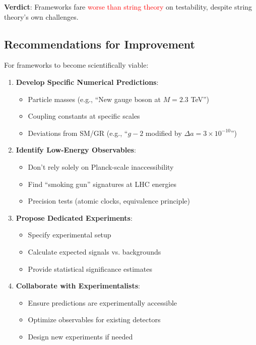 \textbf{Verdict}: Frameworks fare \textcolor{red}{worse than string theory} on testability, despite string theory's own challenges.

\subsection{Recommendations for Improvement}

For frameworks to become scientifically viable:

\begin{enumerate}
    \item \textbf{Develop Specific Numerical Predictions}:
    \begin{itemize}
        \item Particle masses (e.g., ``New gauge boson at $M = 2.3$ TeV'')
        \item Coupling constants at specific scales
        \item Deviations from SM/GR (e.g., ``$g-2$ modified by $\Delta a = 3 \times 10^{-10}$'')
    \end{itemize}

    \item \textbf{Identify Low-Energy Observables}:
    \begin{itemize}
        \item Don't rely solely on Planck-scale inaccessibility
        \item Find ``smoking gun'' signatures at LHC energies
        \item Precision tests (atomic clocks, equivalence principle)
    \end{itemize}

    \item \textbf{Propose Dedicated Experiments}:
    \begin{itemize}
        \item Specify experimental setup
        \item Calculate expected signals vs. backgrounds
        \item Provide statistical significance estimates
    \end{itemize}

    \item \textbf{Collaborate with Experimentalists}:
    \begin{itemize}
        \item Ensure predictions are experimentally accessible
        \item Optimize observables for existing detectors
        \item Design new experiments if needed
    \end{itemize}


\end{enumerate}
